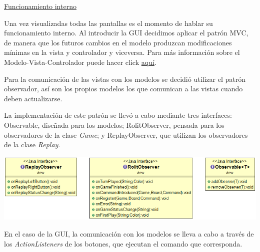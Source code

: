 \documentclass[../DocumentoOficial.tex]{subfiles}
\begin{document}
\begin{sprint}[4]
\underline{Funcionamiento interno}

Una vez visualizadas todas las pantallas es el momento de hablar su funcionamiento interno. Al introducir la GUI decidimos aplicar el patrón MVC, de manera que los futuros cambios en el modelo produzcan modificaciones mínimas en la vista y controlador y viceversa. Para más información sobre el Modelo-Vista-Controlador puede hacer click \hyperref[ch:MVC]{aquí}.

Para la comunicación de las vistas con los modelos se decidió utilizar el patrón observador, así son los propios modelos los que comunican a las vistas cuando deben actualizarse.

La implementación de este patrón se llevó a cabo mediante tres interfaces: Observable, diseñada para los modelos; RolitObserver, pensada para los observadores de la clase \textit{Game}; y ReplayObserver, que utilizan los observadores de la clase \textit{Replay}.

\begin{center}
\includegraphics[scale=0.43]{observadores-sprint4.png}
\end{center}

En el caso de la GUI, la comunicación con los modelos se lleva a cabo a través de los \textit{ActionListeners} de los botones, que ejecutan el comando que corresponda.

\end{sprint}
\end{document}
